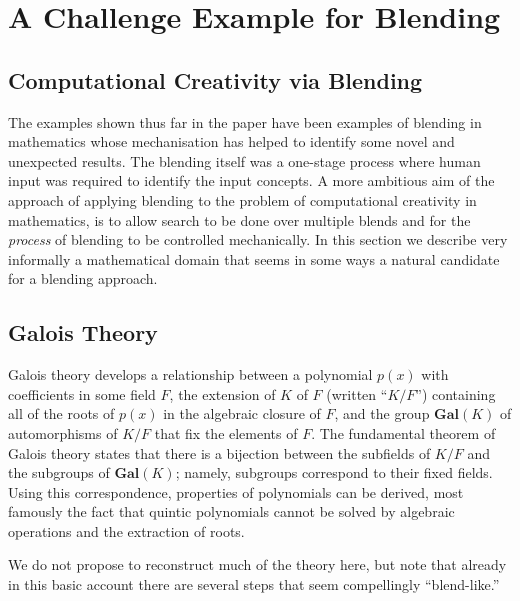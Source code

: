 \section{A Challenge Example for Blending} \label{galois}

\subsection{Computational Creativity via Blending}

The examples shown thus far in the paper have been examples of
blending in mathematics whose mechanisation has helped to identify
some novel and unexpected results. The blending itself was a one-stage
process where human input was required to identify the input
concepts. A more ambitious aim of the approach of applying blending to
the problem of computational creativity in mathematics, is to allow
search to be done over multiple blends and for the {\em process} of
blending to be controlled mechanically. In this section we describe
very informally a mathematical domain that seems in some ways a
natural candidate for a blending approach. 


\subsection{Galois Theory}


Galois theory develops a relationship between a polynomial $p(x)$ with
coefficients in some field $F$, the extension of $K$ of $F$ (written
``$K/F$'') containing all of the roots of $p(x)$ in the algebraic
closure of $F$, and the group $\mathbf{Gal}(K)$ of automorphisms of
$K/F$ that fix the elements of $F$.  The fundamental theorem of Galois
theory states that there is a bijection between the subfields of $K/F$
and the subgroups of $\mathbf{Gal}(K)$; namely, subgroups correspond
to their fixed fields.  Using this correspondence, properties of
polynomials can be derived, most famously the fact that quintic
polynomials cannot be solved by algebraic operations and the
extraction of roots.

We do not propose to reconstruct much of the theory here, but note
that already in this basic account there are several steps that seem
compellingly ``blend-like.''

